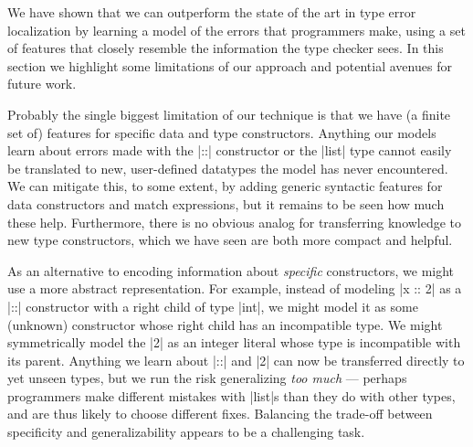 \label{sec:nate:discussion}

We have shown that we can outperform the state of the art in type error
localization by learning a model of the errors that programmers make,
using a set of features that closely resemble the information the type
checker sees.
%
%
In this section we highlight some limitations of our approach and
potential avenues for future work.


Probably the single biggest limitation of our technique is that we have
(a finite set of) features for specific data and type constructors.
%
Anything our models learn about errors made with the |::| constructor or
the |list| type cannot easily be translated to new, user-defined
datatypes the model has never encountered.
%
We can mitigate this, to some extent, by adding generic
syntactic features for data constructors and match expressions, but it
remains to be seen how much these help. %
%
Furthermore, there is no obvious analog for transferring knowledge to
new type constructors, which we have seen are both more compact and
helpful.

As an alternative to encoding information about \emph{specific}
constructors, we might use a more abstract representation.
%
For example, instead of modeling |x :: 2| as a |::| constructor with a
right child of type |int|, we might model it as some (unknown) constructor
whose right child has an incompatible type.
%
We might symmetrically model the |2| as an integer literal whose type is
incompatible with its parent.
%
Anything we learn about |::| and |2| can now be transferred directly to
yet unseen types, but we run the risk generalizing \emph{too much} ---
\ie perhaps programmers make different mistakes with |list|s than they
do with other types, and are thus likely to choose different fixes.
%
Balancing the trade-off between specificity and generalizability appears
to be a challenging task.


